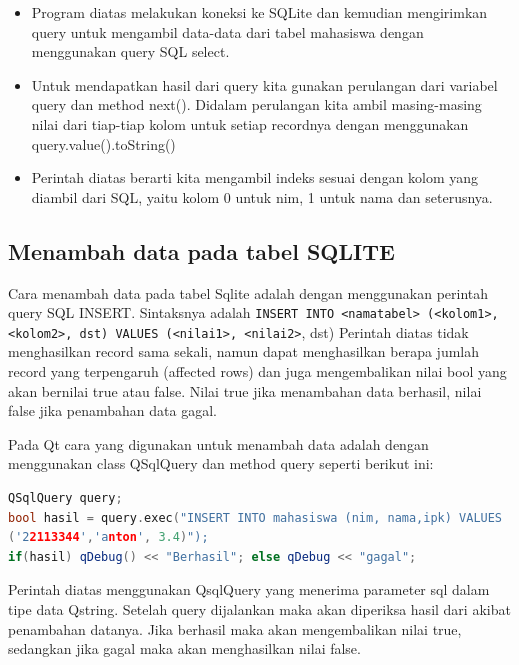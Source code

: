 \begin{itemize}

\item
Program diatas melakukan koneksi ke SQLite dan kemudian mengirimkan
query untuk mengambil data-data dari tabel mahasiswa dengan
menggunakan query SQL select.
\item
Untuk mendapatkan hasil dari query kita gunakan perulangan dari
variabel query dan method next(). Didalam perulangan kita ambil
masing-masing nilai dari tiap-tiap kolom untuk setiap recordnya dengan
menggunakan query.value().toString()
\item
Perintah diatas berarti kita mengambil indeks sesuai dengan kolom yang
diambil dari SQL, yaitu kolom 0 untuk nim, 1 untuk nama dan
seterusnya.
\end{itemize}

\subsection{Menambah data pada tabel SQLITE}\label{menambah-data-pada-tabel-sqlite}

Cara menambah data pada tabel Sqlite adalah dengan menggunakan perintah
query SQL INSERT. Sintaksnya adalah
\texttt{INSERT\ INTO\ \textless{}namatabel\textgreater{}\ (\textless{}kolom1\textgreater{},\textless{}kolom2\textgreater{},\ dst)\ VALUES\ (\textless{}nilai1\textgreater{},\ \textless{}nilai2\textgreater{}},
dst) Perintah diatas tidak menghasilkan record sama sekali, namun dapat
menghasilkan berapa jumlah record yang terpengaruh (affected rows) dan
juga mengembalikan nilai bool yang akan bernilai true atau false. Nilai
true jika menambahan data berhasil, nilai false jika penambahan data
gagal.

Pada Qt cara yang digunakan untuk menambah data adalah dengan
menggunakan class QSqlQuery dan method query seperti berikut ini:

\begin{lstlisting}[language=c++, numbers=none]
QSqlQuery query;
bool hasil = query.exec("INSERT INTO mahasiswa (nim, nama,ipk) VALUES
('22113344','anton', 3.4)");
if(hasil) qDebug() << "Berhasil"; else qDebug << "gagal";
\end{lstlisting}

Perintah diatas menggunakan QsqlQuery yang menerima parameter sql dalam
tipe data Qstring. Setelah query dijalankan maka akan diperiksa hasil
dari akibat penambahan datanya. Jika berhasil maka akan mengembalikan
nilai true, sedangkan jika gagal maka akan menghasilkan nilai false.

